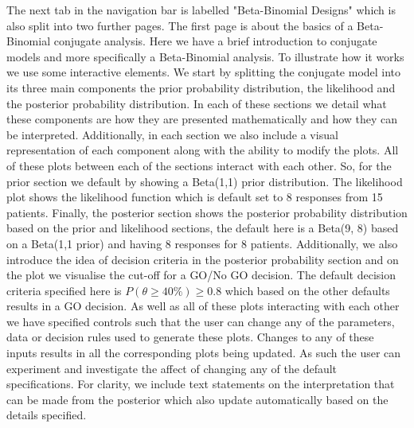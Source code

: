 The next tab in the navigation bar is labelled "Beta-Binomial Designs" which is also split into two further pages. The first page is about the basics of a Beta-Binomial conjugate analysis. Here we have a brief introduction to conjugate models and more specifically a Beta-Binomial analysis. To illustrate how it works we use some interactive elements. We start by splitting the conjugate model into its three main components the prior probability distribution, the likelihood and the posterior probability distribution.  In each of these sections we detail what these components are how they are presented mathematically and how they can be interpreted. Additionally, in each section we also include a visual representation of each component along with the ability to modify the plots. All of these plots between each of the sections interact with each other. So, for the prior section we default by showing a Beta(1,1) prior distribution. The likelihood plot shows the likelihood function which is default set to 8 responses from 15 patients. Finally, the posterior section shows the posterior probability distribution based on the prior and likelihood sections, the default here is a Beta(9, 8) based on a Beta(1,1 prior) and having 8 responses for 8 patients. Additionally, we also introduce the idea of decision criteria in the posterior probability section and on the plot we visualise the cut-off for a GO/No GO decision. The default decision criteria specified here is $P(\theta  \geq 40\%) \geq 0.8$ which based on the other defaults results in a GO decision. As well as all of these plots interacting with each other we have specified controls such that the user can change any of the parameters, data or decision rules used to generate these plots. Changes to any of these inputs results in all the corresponding plots being updated. As such the user can experiment and investigate the affect of changing any of the default specifications. For clarity, we include text statements on the interpretation that can be made from the posterior which also update automatically based on the details specified.

